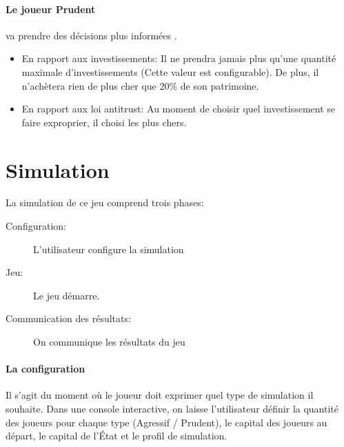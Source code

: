 \documentclass[12pt]{article}
\begin{document}
  
   \paragraph {Le joueur Prudent}  va prendre des décisions plus informées . 
    \begin{itemize}
   	\item En rapport aux investissements: Il ne prendra jamais plus qu'une quantité maximale d'investissements (Cette valeur est configurable). De plus, il n'achètera rien de plus cher que 20\% de son patrimoine. 
	\item En rapport aux loi antitrust: Au moment de choisir quel investissement se faire exproprier, il choisi les plus chers.
   \end{itemize}


\section{Simulation}

 La simulation de ce jeu comprend trois phases:
 \begin{description} 
 	\item [Configuration:] L'utilisateur configure la simulation
	\item [Jeu:] Le jeu démarre. 
	\item [Communication des résultats:] On communique les résultats du jeu  
\end{description}
 
 
 \paragraph{La configuration} Il s'agit du moment où le joueur doit exprimer quel type de simulation il souhaite. 
	Dans une console interactive, on laisse  l'utilisateur définir la quantité des joueurs pour chaque type (Agressif / Prudent), le capital des joueurs au départ, le capital de l'État et le profil de simulation. 
 
\end{document}
